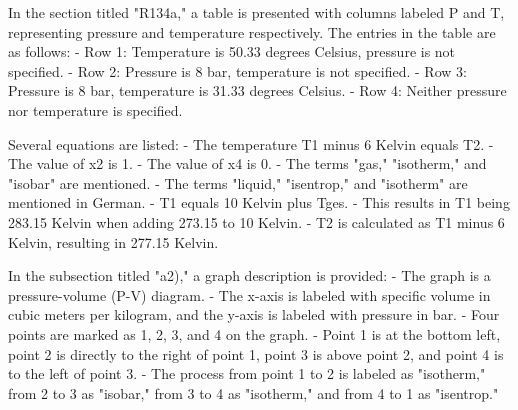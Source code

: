 In the section titled "R134a," a table is presented with columns labeled P and T, representing pressure and temperature respectively. The entries in the table are as follows:
- Row 1: Temperature is 50.33 degrees Celsius, pressure is not specified.
- Row 2: Pressure is 8 bar, temperature is not specified.
- Row 3: Pressure is 8 bar, temperature is 31.33 degrees Celsius.
- Row 4: Neither pressure nor temperature is specified.

Several equations are listed:
- The temperature T1 minus 6 Kelvin equals T2.
- The value of x2 is 1.
- The value of x4 is 0.
- The terms "gas," "isotherm," and "isobar" are mentioned.
- The terms "liquid," "isentrop," and "isotherm" are mentioned in German.
- T1 equals 10 Kelvin plus Tges.
- This results in T1 being 283.15 Kelvin when adding 273.15 to 10 Kelvin.
- T2 is calculated as T1 minus 6 Kelvin, resulting in 277.15 Kelvin.

In the subsection titled "a2)," a graph description is provided:
- The graph is a pressure-volume (P-V) diagram.
- The x-axis is labeled with specific volume in cubic meters per kilogram, and the y-axis is labeled with pressure in bar.
- Four points are marked as 1, 2, 3, and 4 on the graph.
- Point 1 is at the bottom left, point 2 is directly to the right of point 1, point 3 is above point 2, and point 4 is to the left of point 3.
- The process from point 1 to 2 is labeled as "isotherm," from 2 to 3 as "isobar," from 3 to 4 as "isotherm," and from 4 to 1 as "isentrop."